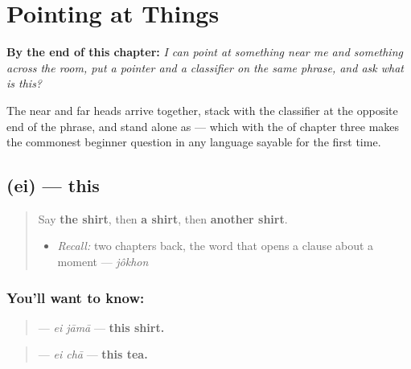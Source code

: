 
\chapter{Pointing at Things}
\label{ch:bn-pointing-at-things}

\begin{chapteropening}
\textbf{By the end of this chapter:} \emph{I can point at something near me and something across the room, put a pointer and a classifier on the same phrase, and ask what is this?}

The near and far heads arrive together, stack with the classifier at the opposite end of the phrase, and stand alone as  — which with the  of chapter three makes the commonest beginner question in any language sayable for the first time.
\end{chapteropening}

\section[\texorpdfstring{\bn{এই} (ei)}{এই (ei)}]{ (ei) — this}

\label{lesson:BN-C21-ei}



\begin{quote}
Say \textbf{the shirt}, then \textbf{a shirt}, then \textbf{another shirt}.

\begin{itemize}
\raggedright
  \item \emph{Recall:} two chapters back, the word that opens a clause about a moment — \emph{jôkhon}
\end{itemize}
\end{quote}

\subsection*{You'll want to know: }
\begin{quote}
\textbf{ } — \emph{ei jāmā} — \textbf{this shirt.}
\end{quote}

\begin{quote}
\textbf{ } — \emph{ei chā} — \textbf{this tea.}
\end{quote}


